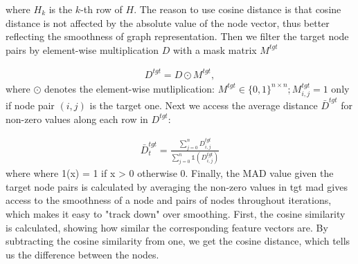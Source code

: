 where $H_{k}$ is the $k$-th row of $H$. The reason to use cosine distance is that cosine distance is not affected by the absolute value of the node vector,
thus better reflecting the smoothness of graph representation. Then we filter the target node pairs by element-wise multiplication $D$ with a mask matrix $M^{tgt}$

\begin{align*}
    D^{tgt} = D \odot M^{tgt},
\end{align*}
where $\odot$ denotes the element-wise mutliplication: $M^{tgt} \in \{0,1\}^{n \times n}; M_{i,j}^{tgt}= 1$ only if node pair $(i,j)$ is the target one.
Next we access the average distance $\bar{D}^{tgt}$ for non-zero values along each row in $D^{tgt}:$

\begin{align*}
    \bar{D}_{t}^{tgt} = \frac{\sum_{j=0}^{n}D_{i,j}^{tgt}}{\sum_{j=0}^{n}\mathds{1}(D_{i,j}^{tgt})}
\end{align*}
where where 1(x) = 1 if x > 0 otherwise 0. Finally, the MAD value given the target node pairs is calculated by averaging the non-zero values in tgt
\Ac{mad} gives access to the smoothness of a node and pairs of nodes throughout iterations, which makes it easy to "track down" over smoothing.
First, the cosine similarity is calculated, showing how similar the corresponding feature vectors are. By subtracting the cosine similarity from one, we get the cosine distance, which tells us the difference between the nodes.
